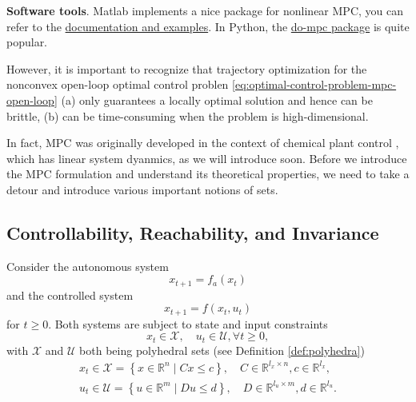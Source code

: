\documentclass[
]{book}
\theoremstyle{definition}
\theoremstyle{definition}
\theoremstyle{definition}
\theoremstyle{definition}
\theoremstyle{remark}
\begin{document}
\textbf{Software tools}. Matlab implements a nice package for nonlinear MPC, you can refer to the \href{https://www.mathworks.com/help/mpc/ug/nonlinear-mpc.html}{documentation and examples}. In Python, the \href{https://www.do-mpc.com/en/latest/}{do-mpc package} is quite popular.

However, it is important to recognize that trajectory optimization for the nonconvex open-loop optimal control problen \eqref{eq:optimal-control-problem-mpc-open-loop} (a) only guarantees a locally optimal solution and hence can be brittle, (b) can be time-consuming when the problem is high-dimensional.

In fact, MPC was originally developed in the context of chemical plant control \citep{borrelli17book-mpc}, which has linear system dyanmics, as we will introduce soon. Before we introduce the MPC formulation and understand its theoretical properties, we need to take a detour and introduce various important notions of sets.

\hypertarget{controllability-reachability-and-invariance}{%
\subsection{Controllability, Reachability, and Invariance}\label{controllability-reachability-and-invariance}}

Consider the autonomous system
\begin{equation}
x_{t+1} = f_a(x_t)
\label{eq:mpc-autonomous-system}
\end{equation}
and the controlled system
\begin{equation}
x_{t+1} = f(x_t, u_t)
\label{eq:mpc-controlled-system}
\end{equation}
for \(t \geq 0\). Both systems are subject to state and input constraints
\begin{equation}
x_t \in \mathcal{X}, \quad u_t \in \mathcal{U}, \forall t \geq 0,
\label{eq:mpc-state-control-constraint}
\end{equation}
with \(\mathcal{X}\) and \(\mathcal{U}\) both being polyhedral sets (see Definition \ref{def:polyhedra})
\begin{equation}
\begin{split}
x_t \in \mathcal{X} = \left\{ x \in \mathbb{R}^n \mid C x \leq c \right\}, \quad C \in \mathbb{R}^{l_x \times n}, c \in \mathbb{R}^{l_x}, \\
u_t \in \mathcal{U} = \left\{ u \in \mathbb{R}^m \mid D u \leq d \right\}, \quad D \in \mathbb{R}^{l_u \times m}, d \in \mathbb{R}^{l_u}.
\end{split}
\label{eq:mpc-polyhedral-definition}
\end{equation}
\end{document}

